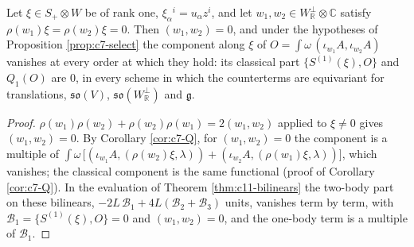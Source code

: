 \begin{proposition}
\label{prop:c11-plane}
Let $\xi\in S_+\otimes W$ be of rank one, $\xi_\alpha{}^i=u_\alpha z^i$, and let $w_1,w_2\in W_{\mathbb R}^\perp\otimes\mathbb C$ satisfy $\rho(w_1)\xi=\rho(w_2)\xi=0$. Then $(w_1,w_2)=0$, and under the hypotheses of Proposition \ref{prop:c7-select} the component along $\xi$ of $O=\int\omega\,(\iota_{w_1}A,\iota_{w_2}A)$ vanishes at every order at which they hold: its classical part $\{S^{(1)}(\xi),O\}$ and $Q_1(O)$ are $0$, in every scheme in which the counterterms are equivariant for translations, $\mathfrak{so}(V)$, $\mathfrak{so}(W_{\mathbb R}^\perp)$ and $\mathfrak g$.
\end{proposition}

\begin{proof}
$\rho(w_1)\rho(w_2)+\rho(w_2)\rho(w_1)=2(w_1,w_2)$ applied to $\xi\ne0$ gives $(w_1,w_2)=0$. By Corollary \ref{cor:c7-Q}, for $(w_1,w_2)=0$ the component is a multiple of $\int\omega\,\big[(\iota_{w_1}A,(\rho(w_2)\xi,\lambda))+(\iota_{w_2}A,(\rho(w_1)\xi,\lambda))\big]$, which vanishes; the classical component is the same functional (proof of Corollary \ref{cor:c7-Q}). In the evaluation of Theorem \ref{thm:c11-bilinears} the two-body part on these bilinears, $-2L\,\mathcal B_1+4L(\mathcal B_2+\mathcal B_3)$ units, vanishes term by term, with $\mathcal B_1=\{S^{(1)}(\xi),O\}=0$ and $(w_1,w_2)=0$, and the one-body term is a multiple of $\mathcal B_1$.
\end{proof}

